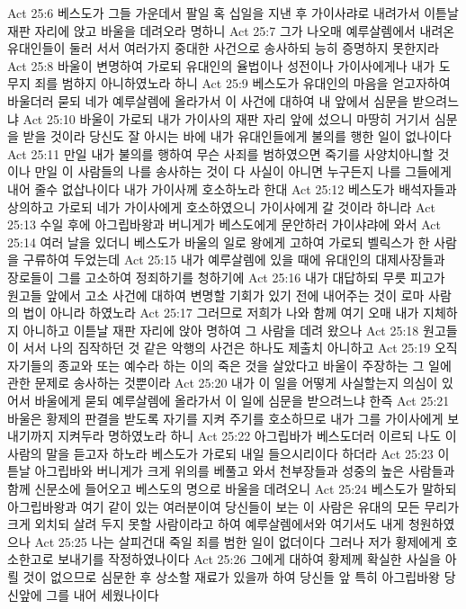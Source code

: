 Act 25:6  베스도가 그들 가운데서 팔일 혹 십일을 지낸 후 가이사랴로 내려가서 이튿날 재판 자리에 앉고 바울을 데려오라 명하니
Act 25:7  그가 나오매 예루살렘에서 내려온 유대인들이 둘러 서서 여러가지 중대한 사건으로 송사하되 능히 증명하지 못한지라
Act 25:8  바울이 변명하여 가로되 유대인의 율법이나 성전이나 가이사에게나 내가 도무지 죄를 범하지 아니하였노라 하니
Act 25:9  베스도가 유대인의 마음을 얻고자하여 바울더러 묻되 네가 예루살렘에 올라가서 이 사건에 대하여 내 앞에서 심문을 받으려느냐
Act 25:10  바울이 가로되 내가 가이사의 재판 자리 앞에 섰으니 마땅히 거기서 심문을 받을 것이라 당신도 잘 아시는 바에 내가 유대인들에게 불의를 행한 일이 없나이다
Act 25:11  만일 내가 불의를 행하여 무슨 사죄를 범하였으면 죽기를 사양치아니할 것이나 만일 이 사람들의 나를 송사하는 것이 다 사실이 아니면 누구든지 나를 그들에게 내어 줄수 없삽나이다 내가 가이사께 호소하노라 한대
Act 25:12  베스도가 배석자들과 상의하고 가로되 네가 가이사에게 호소하였으니 가이사에게 갈 것이라 하니라
Act 25:13  수일 후에 아그립바왕과 버니게가 베스도에게 문안하러 가이샤랴에 와서
Act 25:14  여러 날을 있더니 베스도가 바울의 일로 왕에게 고하여 가로되 벨릭스가 한 사람을 구류하여 두었는데
Act 25:15  내가 예루살렘에 있을 때에 유대인의 대제사장들과 장로들이 그를 고소하여 정죄하기를 청하기에
Act 25:16  내가 대답하되 무릇 피고가 원고들 앞에서 고소 사건에 대하여 변명할 기회가 있기 전에 내어주는 것이 로마 사람의 법이 아니라 하였노라
Act 25:17  그러므로 저희가 나와 함께 여기 오매 내가 지체하지 아니하고 이튿날 재판 자리에 앉아 명하여 그 사람을 데려 왔으나
Act 25:18  원고들이 서서 나의 짐작하던 것 같은 악행의 사건은 하나도 제출치 아니하고
Act 25:19  오직 자기들의 종교와 또는 예수라 하는 이의 죽은 것을 살았다고 바울이 주장하는 그 일에 관한 문제로 송사하는 것뿐이라
Act 25:20  내가 이 일을 어떻게 사실할는지 의심이 있어서 바울에게 묻되 예루살렘에 올라가서 이 일에 심문을 받으려느냐 한즉
Act 25:21  바울은 황제의 판결을 받도록 자기를 지켜 주기를 호소하므로 내가 그를 가이사에게 보내기까지 지켜두라 명하였노라 하니
Act 25:22  아그립바가 베스도더러 이르되 나도 이 사람의 말을 듣고자 하노라 베스도가 가로되 내일 들으시리이다 하더라
Act 25:23  이튿날 아그립바와 버니게가 크게 위의를 베풀고 와서 천부장들과 성중의 높은 사람들과 함께 신문소에 들어오고 베스도의 명으로 바울을 데려오니
Act 25:24  베스도가 말하되 아그립바왕과 여기 같이 있는 여러분이여 당신들이 보는 이 사람은 유대의 모든 무리가 크게 외치되 살려 두지 못할 사람이라고 하여 예루살렘에서와 여기서도 내게 청원하였으나
Act 25:25  나는 살피건대 죽일 죄를 범한 일이 없더이다 그러나 저가 황제에게 호소한고로 보내기를 작정하였나이다
Act 25:26  그에게 대하여 황제께 확실한 사실을 아뢸 것이 없으므로 심문한 후 상소할 재료가 있을까 하여 당신들 앞 특히 아그립바왕 당신앞에 그를 내어 세웠나이다
